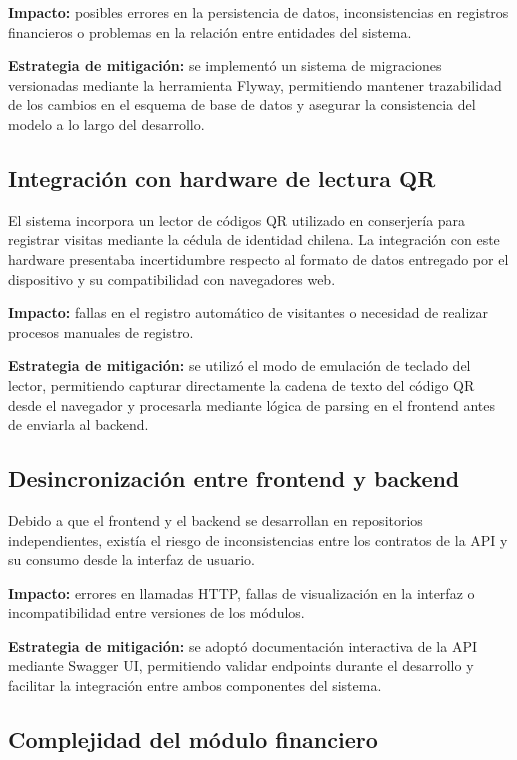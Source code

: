 \textbf{Impacto:} posibles errores en la persistencia de datos, inconsistencias en registros financieros o problemas en la relación entre entidades del sistema.

\textbf{Estrategia de mitigación:} se implementó un sistema de migraciones versionadas mediante la herramienta Flyway, permitiendo mantener trazabilidad de los cambios en el esquema de base de datos y asegurar la consistencia del modelo a lo largo del desarrollo.

\subsection*{Integración con hardware de lectura QR}

El sistema incorpora un lector de códigos QR utilizado en conserjería para registrar visitas mediante la cédula de identidad chilena. 
La integración con este hardware presentaba incertidumbre respecto al formato de datos entregado por el dispositivo y su compatibilidad con navegadores web.

\textbf{Impacto:} fallas en el registro automático de visitantes o necesidad de realizar procesos manuales de registro.

\textbf{Estrategia de mitigación:} se utilizó el modo de emulación de teclado del lector, permitiendo capturar directamente la cadena de texto del código QR desde el navegador y procesarla mediante lógica de parsing en el frontend antes de enviarla al backend.

\subsection*{Desincronización entre frontend y backend}

Debido a que el frontend y el backend se desarrollan en repositorios independientes, existía el riesgo de inconsistencias entre los contratos de la API y su consumo desde la interfaz de usuario.

\textbf{Impacto:} errores en llamadas HTTP, fallas de visualización en la interfaz o incompatibilidad entre versiones de los módulos.

\textbf{Estrategia de mitigación:} se adoptó documentación interactiva de la API mediante Swagger UI, permitiendo validar endpoints durante el desarrollo y facilitar la integración entre ambos componentes del sistema.

\subsection*{Complejidad del módulo financiero}

